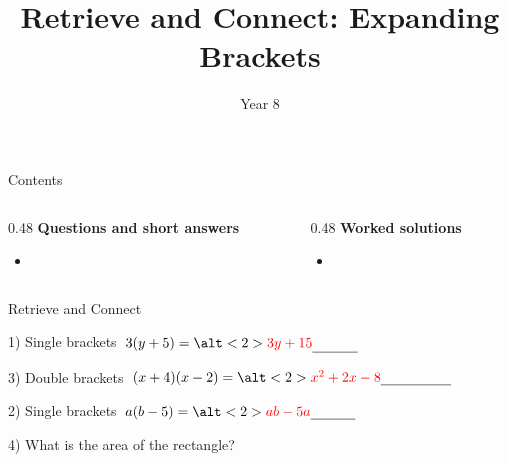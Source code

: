 \documentclass{beamer}
\title{Retrieve and Connect: Expanding Brackets}
\author{Year 8}
\date{}
\newcommand{\ablank}[1]{%
  \alt<2>{\textcolor{red}{#1}}{\underline{\phantom{#1}}}%
}
\newcommand{\ashow}[1]{\uncover<2->{\textcolor{red}{\small #1}}}
\newcommand{\ashowq}[1]{\alt<2->{\textcolor{red}{\small #1}}{?}}
\begin{document}
\frame{\titlepage}

\begin{frame}{Contents}
\small
\begin{columns}[T]
  \begin{column}{0.48\textwidth}
    \textbf{Questions and short answers}
    \begin{itemize}
      \item \hyperlink{q-st1}{}
    \end{itemize}
  \end{column}
  \begin{column}{0.48\textwidth}
    \textbf{Worked solutions}
    \begin{itemize}
      \item \hyperlink{work-st1}{}
    \end{itemize}
  \end{column}
\end{columns}
\end{frame}

\begin{frame}{Retrieve and Connect}
\hypertarget{q-st1}{}
\begin{minipage}[t]{0.48\textwidth}
  \begin{block}{1) Single brackets}
    \Large \(\;3(y+5)=\ablank{3y+15}\)
  \end{block}
  \vspace{0.5em}
  \begin{block}{3) Double brackets}
    \Large \(\;(x+4)(x-2)=\ablank{x^2+2x-8}\)
  \end{block}
\end{minipage}\hfill
\begin{minipage}[t]{0.48\textwidth}
  \begin{block}{2) Single brackets}
    \Large \(\; a(b-5)=\ablank{ab-5a}\)
  \end{block}
  \vspace{0.5em}
  \begin{block}{4) What is the area of the rectangle?}
    \par\vspace{0.5em}
    \ashow{Area = \(x(f+6)\)}
  \end{block}
\end{minipage}
\end{frame}
\end{document}
